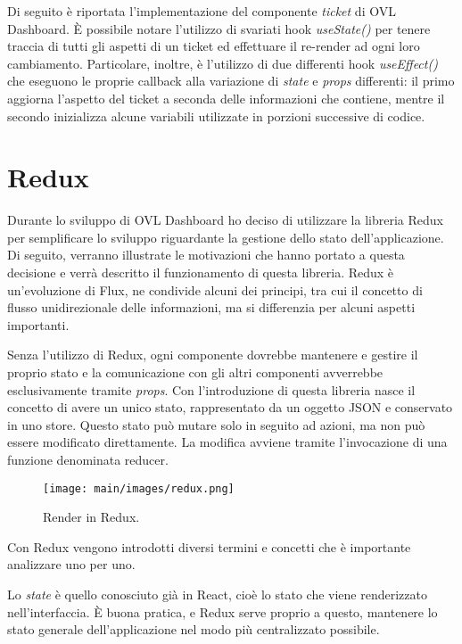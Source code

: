 Di seguito è riportata l'implementazione del componente \textit{ticket} di OVL Dashboard. È possibile notare l'utilizzo di svariati hook \textit{useState()} per tenere traccia di tutti gli aspetti di un ticket ed effettuare il re-render ad ogni loro cambiamento. Particolare, inoltre, è l'utilizzo di due differenti hook \textit{useEffect()} che eseguono le proprie callback alla variazione di \textit{state} e \textit{props} differenti: il primo aggiorna l'aspetto del ticket a seconda delle informazioni che contiene, mentre il secondo inizializza alcune variabili utilizzate in porzioni successive di codice.



\section{Redux}
\label{sec:redux}

Durante lo sviluppo di OVL Dashboard ho deciso di utilizzare la libreria
Redux per semplificare lo sviluppo riguardante la gestione dello stato dell'applicazione. Di seguito, verranno illustrate le motivazioni che hanno portato a questa decisione
e verrà descritto il funzionamento di questa libreria. 
Redux è un'evoluzione di Flux, ne condivide alcuni dei principi, tra cui il concetto di flusso unidirezionale delle informazioni, ma si differenzia per alcuni aspetti importanti.

Senza l'utilizzo di Redux, ogni componente dovrebbe mantenere e gestire il proprio stato e la comunicazione con gli altri componenti avverrebbe esclusivamente tramite \textit{props}. Con l'introduzione di questa libreria nasce il concetto di avere un unico stato, rappresentato da un oggetto JSON e conservato in uno store. Questo stato può mutare solo in seguito ad azioni, ma non può essere modificato direttamente. La modifica avviene tramite l’invocazione di una funzione denominata reducer.

\begin{figure}
\begin{center}
\texttt{[image: main/images/redux.png]}
\end{center}
\caption{Render in Redux.}
\label{fig:reduxFlow}
\end{figure}

Con Redux vengono introdotti diversi termini e concetti che è importante analizzare uno per uno.

Lo \textit{state} è quello conosciuto già in React, cioè lo stato che viene renderizzato nell'interfaccia. È buona pratica, e Redux serve proprio a questo, mantenere lo stato generale dell'applicazione nel modo più centralizzato possibile.


